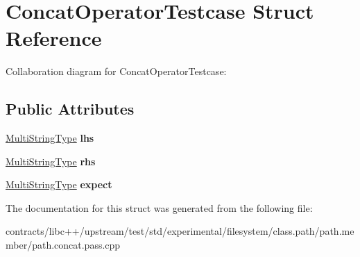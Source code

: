 \hypertarget{struct_concat_operator_testcase}{}\section{Concat\+Operator\+Testcase Struct Reference}
\label{struct_concat_operator_testcase}


Collaboration diagram for Concat\+Operator\+Testcase\+:
\subsection*{Public Attributes}
\begin{DoxyCompactItemize}
\item 
\mbox{\label{struct_concat_operator_testcase_ac51cb179982a0100f6b015453f10b4e5}} 
\mbox{\hyperlink{struct_multi_string_type}{Multi\+String\+Type}} {\bfseries lhs}
\item 
\mbox{\label{struct_concat_operator_testcase_a247dcefa5af05b17edec83c3ec26cdc3}} 
\mbox{\hyperlink{struct_multi_string_type}{Multi\+String\+Type}} {\bfseries rhs}
\item 
\mbox{\label{struct_concat_operator_testcase_a29d7f30da7d05ab499b99a1d1d6d20d6}} 
\mbox{\hyperlink{struct_multi_string_type}{Multi\+String\+Type}} {\bfseries expect}
\end{DoxyCompactItemize}


The documentation for this struct was generated from the following file\+:\begin{DoxyCompactItemize}
\item 
contracts/libc++/upstream/test/std/experimental/filesystem/class.\+path/path.\+member/path.\+concat.\+pass.\+cpp\end{DoxyCompactItemize}
